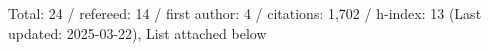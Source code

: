 Total: 24 / refereed: 14 / first author: 4 / citations: 1,702 / h-index: 13 (Last updated: 2025-03-22), List attached below